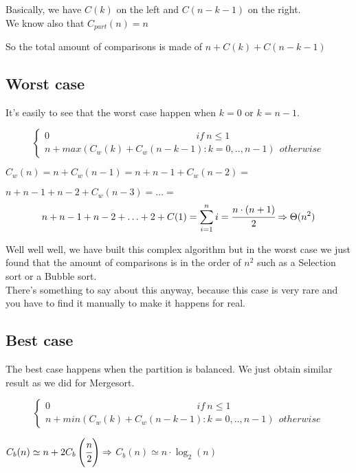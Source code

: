 \documentclass{article}
\begin{document}
Basically, we have $C(k)$ on the left and $C(n-k-1)$ on the right.\\
We know also that $C_{part}(n) = n$

So the total amount of comparisons is made of $n + C(k) + C(n-k-1)$

\subsection{Worst case}
It's easily to see that the worst case happen when $k=0$ or $k=n-1$.
\begin{large}
\begin{equation*}
	\left\{ \begin{aligned}
	0 \ \ \ \ \ \ \ \ \ \ \ \ \ \ \ \ \ \ \ \ \ \ \ \ \ \ \ \ \ \ \ \ \ \ \ \ \ \ \ \ \ \ \ \ \  \ \ \ \ \ \ \ \ \ \ \ \ \ \ \ \ \ \ \ \ \ \ \ \ if \ n \leq 1 \\
	n + max \left(C_w(k) + C_w(n-k-1) : k =0,..,n-1 \right) \ \ otherwise
	\end{aligned} \right.
\end{equation*}

$C_w(n) = n + C_w(n-1) = n + n-1 + C_w(n-2) = $

$ n + n-1 + n-2 + C_w(n-3)=\ldots = $
$$n + n-1 + n-2 + \ldots + 2 + C(1) = \sum_{i=1}^n i = \cfrac{n \cdot (n+1)}{2}  \Rightarrow \Theta(n^2)$$
\end{large}
Well well well, we have built this complex algorithm but in the worst case we just found that the amount of comparisons is in the order of $n^2$ such as a Selection sort or a Bubble sort. \\
There's something to say about this anyway, because this case is very rare and you have to find it manually to make it happens for real.\\

\subsection{Best case}
The best case happens when the partition is balanced. We just obtain similar result as we did for Mergesort.
\begin{large}
\begin{equation*}
	\left\{ \begin{aligned}
	0 \ \ \ \ \ \ \ \ \ \ \ \ \ \ \ \ \ \ \ \ \ \ \ \ \ \ \ \ \ \ \ \ \ \ \ \ \ \ \ \ \ \ \ \ \  \ \ \ \ \ \ \ \ \ \ \ \ \ \ \ \ \ \ \ \ \ \ \ \ if \ n \leq 1 \\
	n + min \left(C_w(k) + C_w(n-k-1) : k =0,..,n-1 \right) \ \ otherwise
	\end{aligned} \right.
\end{equation*}

$C_b(n) \simeq n + 2C_b\left(\cfrac{n}{2}\right) \Rightarrow$
$C_b(n) \simeq n\cdot \log_2(n)$
\end{large}
\end{document}
